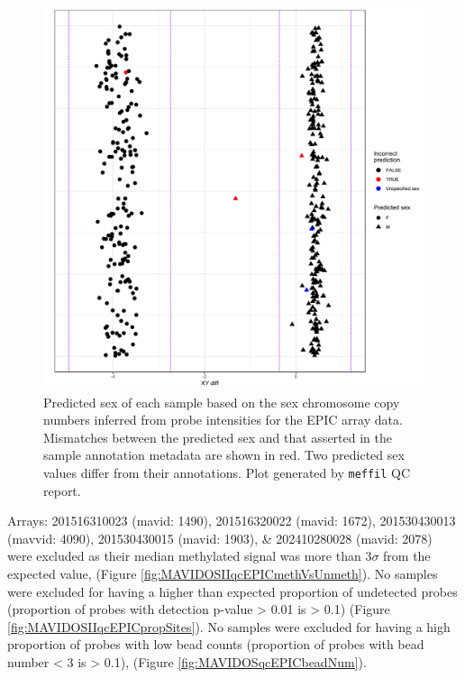 \documentclass[
]{book}
\begin{document}
\begin{figure}

{\centering \includegraphics[width=0.8\linewidth]{figs/MAVIDOS-II-qcEPICsexMismatch} 

}

\caption{Predicted sex of each sample based on the sex chromosome copy numbers inferred from probe intensities for the EPIC array data. Mismatches between the predicted sex and that asserted in the sample annotation metadata are shown in red. Two predicted sex values differ from their annotations. Plot generated by \texttt{meffil} QC report.}\label{fig:MAVIDOSIIqcEPICsexMismatch}
\end{figure}



Arrays: 201516310023 (mavid: 1490), 201516320022 (mavid: 1672), 201530430013 (mavvid: 4090), 201530430015 (mavid: 1903), \& 202410280028 (mavid: 2078) were excluded as their median methylated signal was more than \(3\sigma\) from the expected value, (Figure \ref{fig:MAVIDOSIIqcEPICmethVsUnmeth}).
No samples were excluded for having a higher than expected proportion of undetected probes (proportion of probes with detection p-value \textgreater{} 0.01 is \textgreater{} 0.1) (Figure \ref{fig:MAVIDOSIIqcEPICpropSites}).
No samples were excluded for having a high proportion of probes with low bead counts (proportion of probes with bead number \textless{} 3 is \textgreater{} 0.1), (Figure \ref{fig:MAVIDOSqcEPICbeadNum}).
\end{document}
